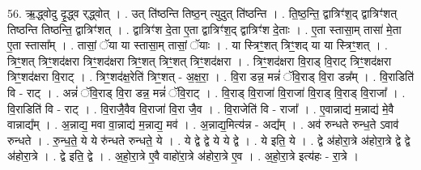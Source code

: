 \documentclass[17pt]{extarticle}
\begin{document}
56. ऋ॒द्ध्वोदु दृ॒द्ध्व र्‌द्ध्वोत् । . उत् ति॑ष्ठन्ति तिष्ठ॒न् त्युदुत् ति॑ष्ठन्ति । . ति॒ष्ठ॒न्ति॒ द्वात्रिꣳ॑श॒द् द्वात्रिꣳ॑शत् तिष्ठन्ति तिष्ठन्ति॒ द्वात्रिꣳ॑शत् । . द्वात्रिꣳ॑श दे॒ता ए॒ता द्वात्रिꣳ॑श॒द् द्वात्रिꣳ॑श दे॒ताः । . ए॒ता स्तासा॒म् तासा॑ मे॒ता ए॒ता स्तासा᳚म् । . तासां॒ ॅया या स्तासा॒म् तासां॒ ॅयाः । . या स्त्रिꣳ॒॒शत् त्रिꣳ॒॒शद् या या स्त्रिꣳ॒॒शत् । . त्रिꣳ॒॒शत् त्रिꣳ॒॒शद॑क्षरा त्रिꣳ॒॒शद॑क्षरा त्रिꣳ॒॒शत् त्रिꣳ॒॒शत् त्रिꣳ॒॒शद॑क्षरा । . त्रिꣳ॒॒शद॑क्षरा वि॒राड् वि॒राट् त्रिꣳ॒॒शद॑क्षरा त्रिꣳ॒॒शद॑क्षरा वि॒राट् । . त्रिꣳ॒॒शद॑क्ष॒रेति॑ त्रिꣳ॒॒शत् - अ॒क्ष॒रा॒ । . वि॒रा डन्न॒ मन्नं॑ ॅवि॒राड् वि॒रा डन्न᳚म् । . वि॒राडिति॑ वि - राट् । . अन्नं॑ ॅवि॒राड् वि॒रा डन्न॒ मन्नं॑ ॅवि॒राट् । . वि॒राड् वि॒राजा॑ वि॒राजा॑ वि॒राड् वि॒राड् वि॒राजा᳚ । . वि॒राडिति॑ वि - राट् । . वि॒राजै॒वैव वि॒राजा॑ वि॒रा जै॒व । . वि॒राजेति॑ वि - राजा᳚ । . ए॒वान्नाद्य॑ म॒न्नाद्य॑ मे॒वै वान्नाद्य᳚म् । . अ॒न्नाद्य॒ मवा वा॒न्नाद्य॑ म॒न्नाद्य॒ मव॑ । . अ॒न्नाद्य॒मित्य॑न्न - अद्य᳚म् । . अव॑ रुन्धते रुन्ध॒ते ऽवाव॑ रुन्धते । . रु॒न्ध॒ते॒ ये ये रु॑न्धते रुन्धते॒ ये । . ये द्वे द्वे ये ये द्वे । . ये इति॒ ये । . द्वे अ॑होरा॒त्रे अ॑होरा॒त्रे द्वे द्वे अ॑होरा॒त्रे । . द्वे इति॒ द्वे । . अ॒हो॒रा॒त्रे ए॒वै वाहो॑रा॒त्रे अ॑होरा॒त्रे ए॒व । . अ॒हो॒रा॒त्रे इत्य॑हः - रा॒त्रे । \newline
\end{document}
